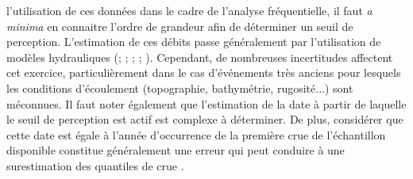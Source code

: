 l'utilisation de ces données dans le cadre de l'analyse fréquentielle, il faut \textit{a minima} en connaitre l'ordre de grandeur afin de déterminer un seuil de perception. L'estimation de ces débits passe généralement par l'utilisation de modèles hydrauliques (\cite{naulet_flood_2005}; \cite{neppel_flood_2010}; \cite{wetter_largest_2011}; \cite{machado_flood_2015}; \cite{ruiz-bellet_uncertainty_2017}). Cependant, de nombreuses incertitudes affectent cet exercice, particulièrement dans le cas d'événements très anciens pour lesquels les conditions d'écoulement (topographie, bathymétrie, rugosité...) sont méconnues. Il faut noter également que l'estimation de la date à partir de laquelle le seuil de perception est actif est complexe à déterminer. De plus, considérer que cette date est égale à l'année d'occurrence de la première crue de l'échantillon disponible constitue généralement une erreur qui peut conduire à une surestimation des quantiles de crue \citep{prosdocimi_german_2018}.

%
%


